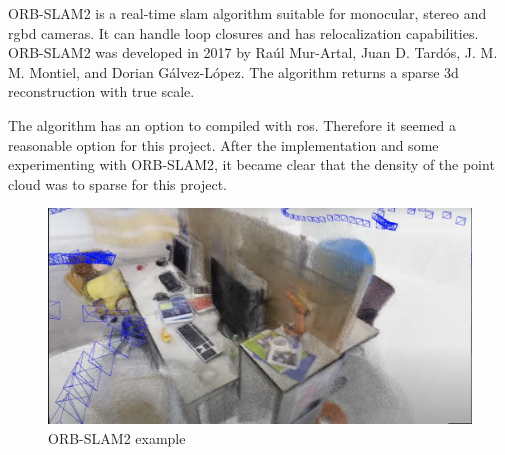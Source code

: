 ORB\hyp{}SLAM2 is a real\hyp{}time \acs{slam} algorithm suitable for monocular, stereo and \acs{rgbd} cameras. It can handle loop closures and has relocalization capabilities. ORB-SLAM2 was developed in 2017 by Ra\'ul Mur\hyp{}Artal, Juan D. Tard\'os, J. M. M. Montiel, and Dorian G\'alvez\hyp{}L\'opez. The algorithm returns a sparse \acs{3d} reconstruction with true scale. \cite{orb_slam2_github} \cite{mur_orb_slam_2}

The algorithm has an option to compiled with \acs{ros}. Therefore it seemed a reasonable option for this project. After the implementation and some experimenting with ORB\hyp{}SLAM2, it became clear that the density of the point cloud was to sparse for this project.

\begin{figure}[!h]
  \centering
  \includegraphics[width=\linewidth]{images/orb_slam2.png}
  \caption{ORB\hyp{}SLAM2 example \cite{orb_slam2_youtube}}
\end{figure}